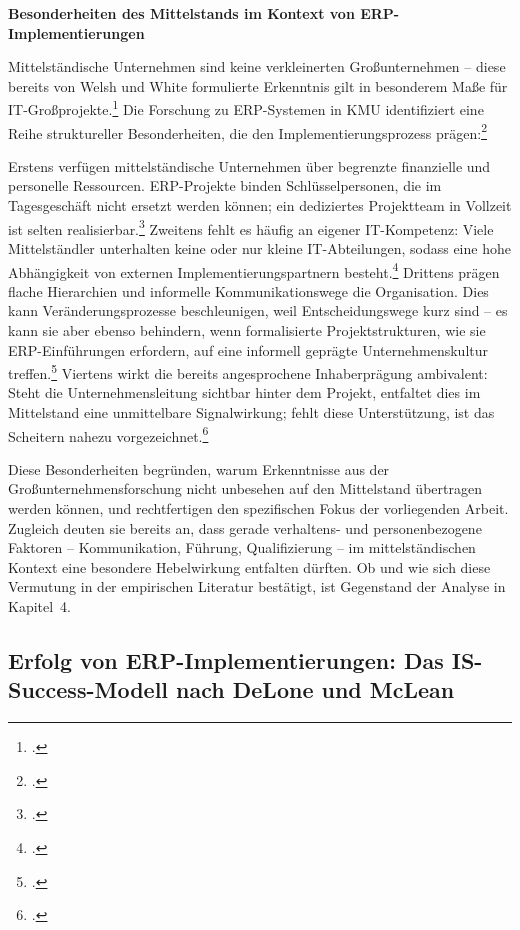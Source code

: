 \textbf{Besonderheiten des Mittelstands im Kontext von ERP-Implementierungen}

Mittelst\"andische Unternehmen sind keine verkleinerten Gro\ss{}unternehmen -- diese bereits von Welsh und White formulierte Erkenntnis gilt in besonderem Ma\ss{}e f\"ur IT-Gro\ss{}projekte.\footcite[Vgl.][S.~18]{welsh1981} Die Forschung zu ERP-Systemen in KMU identifiziert eine Reihe struktureller Besonderheiten, die den Implementierungsprozess pr\"agen:\footcite[Vgl.][S.~1--10]{haddara2011}

Erstens verf\"ugen mittelst\"andische Unternehmen \"uber begrenzte finanzielle und personelle Ressourcen. ERP-Projekte binden Schl\"usselpersonen, die im Tagesgesch\"aft nicht ersetzt werden k\"onnen; ein dediziertes Projektteam in Vollzeit ist selten realisierbar.\footcite[Vgl.][S.~28--30]{malhotra2010} Zweitens fehlt es h\"aufig an eigener IT-Kompetenz: Viele Mittelst\"andler unterhalten keine oder nur kleine IT-Abteilungen, sodass eine hohe Abh\"angigkeit von externen Implementierungspartnern besteht.\footcite[Vgl.][S.~5--7]{haddara2011} Drittens pr\"agen flache Hierarchien und informelle Kommunikationswege die Organisation. Dies kann Ver\"anderungsprozesse beschleunigen, weil Entscheidungswege kurz sind -- es kann sie aber ebenso behindern, wenn formalisierte Projektstrukturen, wie sie ERP-Einf\"uhrungen erfordern, auf eine informell gepr\"agte Unternehmenskultur treffen.\footcite[Vgl.][S.~309--312]{zach2014} Viertens wirkt die bereits angesprochene Inhaberpr\"agung ambivalent: Steht die Unternehmensleitung sichtbar hinter dem Projekt, entfaltet dies im Mittelstand eine unmittelbare Signalwirkung; fehlt diese Unterst\"utzung, ist das Scheitern nahezu vorgezeichnet.\footcite[Vgl.][S.~258--259]{somers2004}

Diese Besonderheiten begr\"unden, warum Erkenntnisse aus der Gro\ss{}unternehmensforschung nicht unbesehen auf den Mittelstand \"ubertragen werden k\"onnen, und rechtfertigen den spezifischen Fokus der vorliegenden Arbeit. Zugleich deuten sie bereits an, dass gerade verhaltens- und personenbezogene Faktoren -- Kommunikation, F\"uhrung, Qualifizierung -- im mittelst\"andischen Kontext eine besondere Hebelwirkung entfalten d\"urften. Ob und wie sich diese Vermutung in der empirischen Literatur best\"atigt, ist Gegenstand der Analyse in Kapitel~4.

\subsection{Erfolg von ERP-Implementierungen: Das IS-Success-Modell nach DeLone und McLean}

